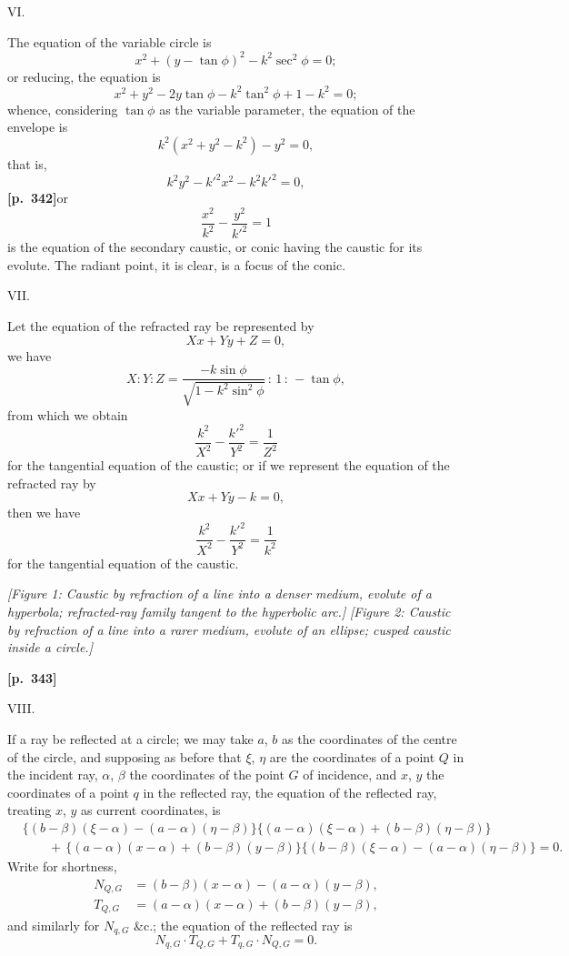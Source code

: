\documentclass[11pt]{article}
\begin{document}
\medskip
\begin{center}VI.\end{center}

The equation of the variable circle is
\[
x^{2} + (y-\tan\phi)^{2} - k^{2}\sec^{2}\phi = 0;
\]
or reducing, the equation is
\[
x^{2} + y^{2} - 2y\tan\phi - k^{2}\tan^{2}\phi + 1 - k^{2} = 0;
\]
whence, considering $\tan\phi$ as the variable parameter, the equation of the envelope is
\[
k^{2}(x^{2} + y^{2} - k^{2}) - y^{2} = 0,
\]
that is,
\[
k^{2}y^{2} - k'^{2}x^{2} - k^{2}k'^{2} = 0,
\]
\textbf{[p.~342]}\quad or
\[
\frac{x^{2}}{k^{2}} - \frac{y^{2}}{k'^{2}} = 1
\]
is the equation of the secondary caustic, or conic having the caustic for its evolute. The radiant point, it is clear, is a focus of the conic.

\medskip
\begin{center}VII.\end{center}

Let the equation of the refracted ray be represented by
\[
Xx + Yy + Z = 0,
\]
we have
\[
X : Y : Z = \frac{-k\sin\phi}{\sqrt{1-k^{2}\sin^{2}\phi}} \,:\, 1 \,:\, -\tan\phi,
\]
from which we obtain
\[
\frac{k^{2}}{X^{2}} - \frac{k'^{2}}{Y^{2}} = \frac{1}{Z^{2}}
\]
for the tangential equation of the caustic; or if we represent the equation of the refracted ray by
\[
Xx + Yy - k = 0,
\]
then we have
\[
\frac{k^{2}}{X^{2}} - \frac{k'^{2}}{Y^{2}} = \frac{1}{k^{2}}
\]
for the tangential equation of the caustic.

\medskip
\begin{center}
\textit{[Figure 1: Caustic by refraction of a line into a denser medium, evolute of a hyperbola; refracted-ray family tangent to the hyperbolic arc.]}\qquad
\textit{[Figure 2: Caustic by refraction of a line into a rarer medium, evolute of an ellipse; cusped caustic inside a circle.]}
\end{center}

\medskip
\noindent\textbf{[p.~343]}
\begin{center}VIII.\end{center}

If a ray be reflected at a circle; we may take $a$, $b$ as the coordinates of the centre of the circle, and supposing as before that $\xi$, $\eta$ are the coordinates of a point $Q$ in the incident ray, $\alpha$, $\beta$ the coordinates of the point $G$ of incidence, and $x$, $y$ the coordinates of a point $q$ in the reflected ray, the equation of the reflected ray, treating $x$, $y$ as current coordinates, is
\begin{align*}
&\{(b-\beta)(\xi-\alpha)-(a-\alpha)(\eta-\beta)\}\{(a-\alpha)(\xi-\alpha)+(b-\beta)(\eta-\beta)\}\\
&\qquad +\,\{(a-\alpha)(x-\alpha)+(b-\beta)(y-\beta)\}\{(b-\beta)(\xi-\alpha)-(a-\alpha)(\eta-\beta)\}=0.
\end{align*}
Write for shortness,
\begin{align*}
N_{Q,G} &= (b-\beta)(x-\alpha)-(a-\alpha)(y-\beta),\\
T_{Q,G} &= (a-\alpha)(x-\alpha)+(b-\beta)(y-\beta),
\end{align*}
and similarly for $N_{q,G}$ \&c.; the equation of the reflected ray is
\[
N_{q,G}\cdot T_{Q,G} + T_{q,G}\cdot N_{Q,G} = 0.
\]
\end{document}
